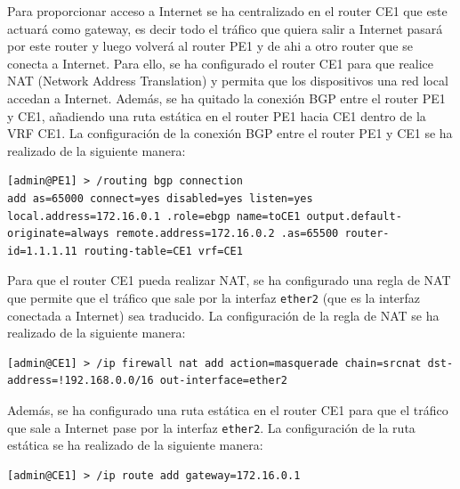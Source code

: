 



Para proporcionar acceso a Internet se ha centralizado en el router CE1 que este actuará como gateway, es decir todo el tráfico que quiera salir a Internet pasará por este router y luego volverá al router PE1 y de ahi a otro router que se conecta a Internet. Para ello, se ha configurado el router CE1 para que realice NAT (Network Address Translation) y permita que los dispositivos una red local accedan a Internet. Además, se ha quitado la conexión BGP entre el router PE1 y CE1, añadiendo una ruta estática en el router PE1 hacia CE1 dentro de la VRF CE1. La configuración de la conexión BGP entre el router PE1 y CE1 se ha realizado de la siguiente manera:
\begin{lstlisting}[language=RouterOS]
[admin@PE1] > /routing bgp connection
add as=65000 connect=yes disabled=yes listen=yes local.address=172.16.0.1 .role=ebgp name=toCE1 output.default-originate=always remote.address=172.16.0.2 .as=65500 router-id=1.1.1.11 routing-table=CE1 vrf=CE1
\end{lstlisting}

Para que el router CE1 pueda realizar NAT, se ha configurado una regla de NAT que permite que el tráfico que sale por la interfaz \texttt{ether2} (que es la interfaz conectada a Internet) sea traducido. La configuración de la regla de NAT se ha realizado de la siguiente manera:
\begin{lstlisting}[language=RouterOS]
[admin@CE1] > /ip firewall nat add action=masquerade chain=srcnat dst-address=!192.168.0.0/16 out-interface=ether2
\end{lstlisting}

Además, se ha configurado una ruta estática en el router CE1 para que el tráfico que sale a Internet pase por la interfaz \texttt{ether2}. La configuración de la ruta estática se ha realizado de la siguiente manera:
\begin{lstlisting}[language=RouterOS]
[admin@CE1] > /ip route add gateway=172.16.0.1
\end{lstlisting}

